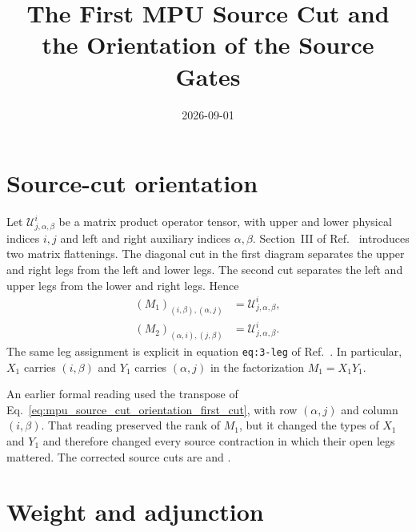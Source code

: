 \documentclass{article}
\title{The First MPU Source Cut and the Orientation of the Source Gates}
\author{}
\date{2026-09-01}
\begin{document}
\maketitle
{}

\section{Source-cut orientation}

Let $\mathcal U^i_{j,\alpha,\beta}$ be a matrix product operator tensor, with
upper and lower physical indices $i,j$ and left and right auxiliary indices
$\alpha,\beta$. Section~III of Ref.~\cite{Cirac2017MPU} introduces two matrix
flattenings. The diagonal cut in the first diagram separates the upper and
right legs from the left and lower legs. The second cut separates the left and
upper legs from the lower and right legs. Hence
\begin{align}
    (M_1)_{(i,\beta),(\alpha,j)}
     & =\mathcal U^i_{j,\alpha,\beta},
    \label{eq:mpu_source_cut_orientation_first_cut} \\
    (M_2)_{(\alpha,i),(j,\beta)}
     & =\mathcal U^i_{j,\alpha,\beta}.
    \label{eq:mpu_source_cut_orientation_second_cut}
\end{align}
The same leg assignment is explicit in equation \texttt{eq:3-leg} of
Ref.~\cite{FrancoRubio2025MPUGauging}. In particular, $X_1$ carries $(i,\beta)$
and $Y_1$ carries $(\alpha,j)$ in the factorization $M_1=X_1Y_1$.

An earlier formal reading used the transpose of
Eq.~\ref{eq:mpu_source_cut_orientation_first_cut}, with row $(\alpha,j)$ and
column $(i,\beta)$. That reading preserved the rank of $M_1$, but it changed
the types of $X_1$ and $Y_1$ and therefore changed every source contraction in
which their open legs mattered. The corrected source cuts are
 and .

\section{Weight and adjunction}
\end{document}
